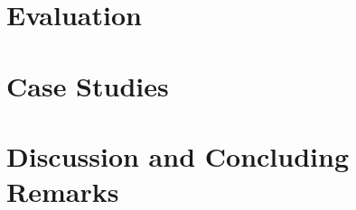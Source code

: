 \documentclass[
  fontsize=12pt,
  titlepage=firstiscover,
  paper=letter,
  oneside,
  cleardoublepage=plain,
  parskip=half-,
  DIV=10,
  parindent,
  appendixprefix,
  chapterprefix,
  listof=totoc,
]{scrbook}
\begin{document}
\chapter{Evaluation}%
\label{c:evaluation}


\chapter{Case Studies}%
\label{c:case-studies}


\chapter{Discussion and Concluding Remarks}%
\label{c:discussion}


% 

\cleardoublepage%
\printbibliography[heading=bibintoc]%

\appendix%
\printglossary[type=\acronymtype, title=List of Acronyms, toctitle=List of Acronyms]
\end{document}
